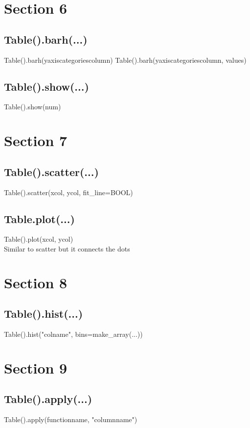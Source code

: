 \documentclass[10pt, a4paper, twocolumn]{article}
\begin{document}
    \section{Section 6}
    \subsection{Table().barh(...)}
    Table().barh(yaxiscategoriescolumn)
    Table().barh(yaxiscategoriescolumn, values)
    \subsection{Table().show(...)}
    Table().show(num)

    \section{Section 7}
    \subsection{Table().scatter(...)}
    Table().scatter(xcol, ycol, fit\_line=BOOL)\\
    \subsection{Table.plot(...)}
    Table().plot(xcol, ycol)\\
    Similar to scatter but it connects the dots\\

    \section{Section 8}
    \subsection{Table().hist(...)}
    Table().hist("colname", bins=make\_array(...))\\

    \section{Section 9}
    \subsection{Table().apply(...)}
    Table().apply(functionname, "columnname")\\
\end{document}
